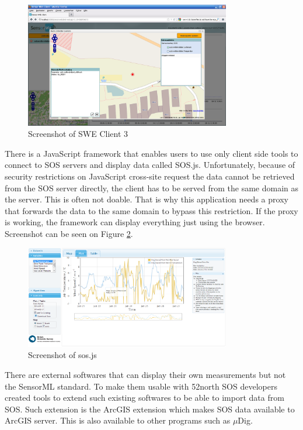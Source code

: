 \begin{figure}[h]
\centering
\includegraphics[width=0.8\textwidth]{figures/sweclient.png}
\caption{Screenshot of SWE Client 3\label{fig:sweclient}}
\end{figure}

There is a JavaScript framework that enables users to use only client side tools to connect to SOS servers and display data called SOS.js. Unfortunately, because of security restrictions on JavaScript cross-site request the data cannot be retrieved from the SOS server directly, the client has to be served from the same domain as the server. This is often not doable. That is why this application needs a proxy that forwards the data to the same domain to bypass this restriction. If the proxy is working, the framework can display everything just using the browser. Screenshot can be seen on Figure \ref{fig:sos-js}.

\begin{figure}[h]
\centering
\includegraphics[width=0.8\textwidth]{figures/sos-js.png}
\caption{Screenshot of sos.js\label{fig:sos-js}}
\end{figure}

There are external softwares that can display their own measurements but not the SensorML standard. To make them usable with 52north SOS developers created tools to extend such existing softwares to be able to import data from SOS.
Such extension is the ArcGIS extension which makes SOS data available to ArcGIS server. This is also available to other programs such as $\mu$Dig. 

